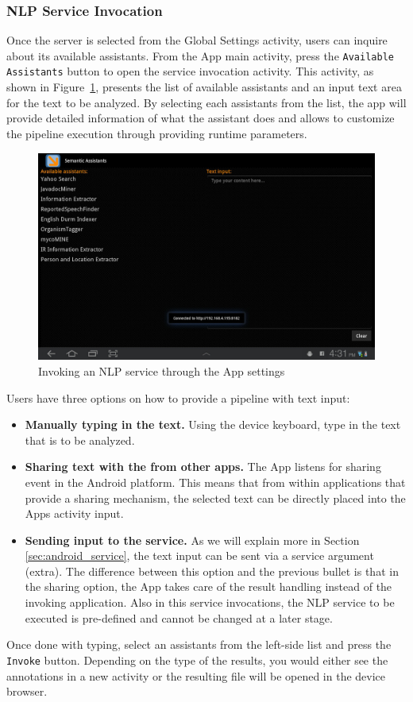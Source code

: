 \subsubsection{NLP Service Invocation}
Once the \sa server is selected from the Global Settings activity, users can inquire about its available assistants. From the \sa App main activity, press the \texttt{Available Assistants} button to open the service invocation activity. This activity, as shown in Figure~\ref{fig:android_invoke_main}, presents the list of available assistants and an input text area for the text to be analyzed. By selecting each assistants from the list, the app will provide detailed information of what the assistant does and allows to customize the pipeline execution through providing runtime parameters.

\begin{figure}[htb]
\centering
\includegraphics[scale=0.35]{pictures/android_invoke_main.jpg}
\caption{Invoking an NLP service through the \sa App settings}
\label{fig:android_invoke_main}
\end{figure}

Users have three options on how to provide a pipeline with text input:
\begin{itemize}
\item{\textbf{Manually typing in the text. }}{Using the device keyboard, type in the text that is to be analyzed.}
\item{\textbf{Sharing text with the \sa from other apps. }}{The \sa App listens for sharing event in the Android platform. This means that from within applications that provide a sharing mechanism, the selected text can be directly placed into the \sa Apps activity input.}
\item{\textbf{Sending input to the \sa service. }}{As we will explain more in Section \ref{sec:android_service}, the text input can be sent via a service argument (extra). The difference between this option and the previous bullet is that in the sharing option, the \sa App takes care of the result handling instead of the invoking application. Also in this service invocations, the NLP service to be executed is pre-defined and cannot be changed at a later stage.}
\end{itemize}
Once done with typing, select an assistants from the left-side list and press the \texttt{Invoke} button. Depending on the type of the results, you would either see the annotations in a new activity or the resulting file will be opened in the device browser.

